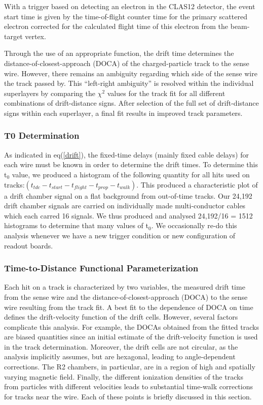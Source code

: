 With a trigger based on detecting an electron in the CLAS12 detector, the event start time is 
given by the time-of-flight counter time for the primary scattered electron 
corrected for the calculated flight time of this electron from the beam-target vertex.

Through the use of an appropriate function, the drift time determines the 
distance-of-closest-approach (DOCA) of the charged-particle track to the sense 
wire.  However, there remains an ambiguity regarding which side of the sense 
wire the track passed by.  This ``left-right ambiguity'' is resolved within 
the individual superlayers by comparing the $\chi^2$ values for the track fit 
for all different combinations of drift-distance signs.  After selection of 
the full set of drift-distance signs within each superlayer, a final fit 
results in improved track parameters.

\subsubsection{T0 Determination}
As indicated in eq(\ref{drift}), the fixed-time delays (mainly fixed cable delays) 
for each wire must be known in order to determine the drift times.   To determine
this t$_0$ value, we produced a histogram of the following quantity for all hits
used on tracks:$ ( t_{tdc} - t_{start} - t_{flight} - t_{prop} - t_{walk} )$.
This produced a characteristic plot of a drift chamber signal on a flat
background from out-of-time tracks.  Our 24,192 drift chamber signals are carried
on individually made multi-conductor cables which each carred 16 signals.  We thus
produced and analysed 24,192/16 = 1512 histograms to determine that many values of
t$_0$. We occasionally re-do this analysis whenever we have a new trigger condition
or new configuration of readout boards.


\subsubsection{Time-to-Distance Functional Parameterization}
\label{tdistcal}

\hskip 0.15in
Each hit on a track is characterized by two variables, the measured drift 
time from the sense wire and the distance-of-closest-approach (DOCA) to the 
sense wire resulting from the track fit.  
A best fit to the dependence of DOCA on time defines the 
drift-velocity function of the drift cells. However, several factors 
complicate this analysis. For example, the DOCAs obtained from the fitted 
tracks are biased quantities since an initial estimate of the drift-velocity 
function is used in the track determination.  Moreover, the drift cells are 
not circular, as the analysis implicitly assumes, but are hexagonal, leading 
to angle-dependent corrections.   The R2 chambers, in particular, are in a 
region of high and spatially varying magnetic field.  Finally, the different 
ionization densities of the tracks from particles with different velocities 
leads to substantial time-walk corrections for tracks near the wire.  Each of 
these points is briefly discussed in this section.



